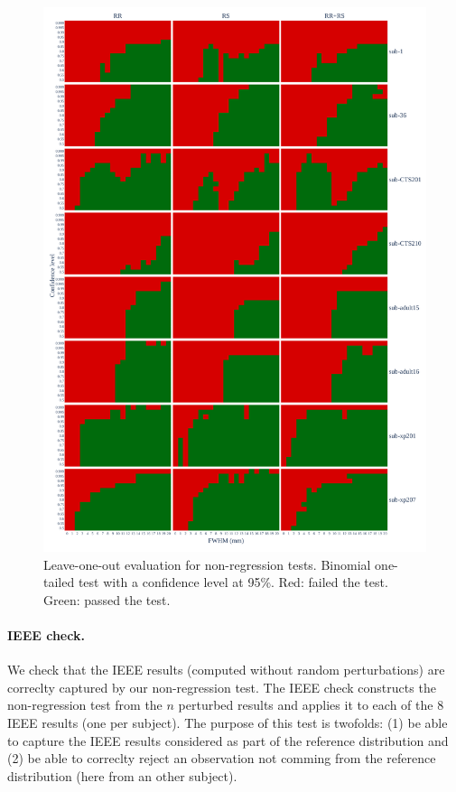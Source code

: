 \documentclass{article}
\begin{document}
\begin{figure}
    \centering
    \includegraphics[width=\linewidth]{figures/exclude_mct_fwe_bonferroni.pdf}
    \caption{Leave-one-out evaluation for non-regression tests.
        Binomial one-tailed test with a confidence level at 95\%.
        Red: failed the test. Green: passed the test.}
    \label{fig:loo_bonferroni}
\end{figure}


\paragraph{IEEE check.} We check that the IEEE results (computed without random perturbations)
are correclty captured by our non-regression test. The IEEE check constructs the non-regression test from the
$n$ perturbed results and applies it to each of the 8 IEEE results (one per subject).
The purpose of this test is twofolds:
(1) be able to capture the IEEE results considered as part of the reference distribution and
(2) be able to correclty reject an observation not comming from the reference distribution (here from an other subject).
\end{document}
